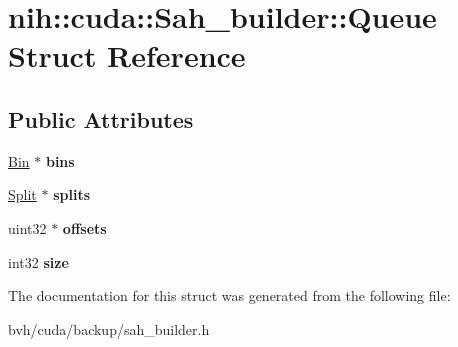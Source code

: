 \hypertarget{structnih_1_1cuda_1_1_sah__builder_1_1_queue}{
\section{nih\-:\-:cuda\-:\-:\-Sah\-\_\-builder\-:\-:\-Queue \-Struct \-Reference}
\label{structnih_1_1cuda_1_1_sah__builder_1_1_queue}
}
\subsection*{\-Public \-Attributes}
\begin{DoxyCompactItemize}
\item 
\hypertarget{structnih_1_1cuda_1_1_sah__builder_1_1_queue_afeb7261cf5ee3d888c67f3a0fdda3cad}{
\hyperlink{structnih_1_1cuda_1_1_sah__builder_1_1_bin}{\-Bin} $\ast$ {\bfseries bins}}
\label{structnih_1_1cuda_1_1_sah__builder_1_1_queue_afeb7261cf5ee3d888c67f3a0fdda3cad}

\item 
\hypertarget{structnih_1_1cuda_1_1_sah__builder_1_1_queue_a55fce2cbbb5389fa0d82b2c4e5d1653a}{
\hyperlink{structnih_1_1cuda_1_1_sah__builder_1_1_split}{\-Split} $\ast$ {\bfseries splits}}
\label{structnih_1_1cuda_1_1_sah__builder_1_1_queue_a55fce2cbbb5389fa0d82b2c4e5d1653a}

\item 
\hypertarget{structnih_1_1cuda_1_1_sah__builder_1_1_queue_a3ddbfa702fc7e03059ce26c59e121011}{
uint32 $\ast$ {\bfseries offsets}}
\label{structnih_1_1cuda_1_1_sah__builder_1_1_queue_a3ddbfa702fc7e03059ce26c59e121011}

\item 
\hypertarget{structnih_1_1cuda_1_1_sah__builder_1_1_queue_a171ed77d5b868345a6f1c6207b662316}{
int32 {\bfseries size}}
\label{structnih_1_1cuda_1_1_sah__builder_1_1_queue_a171ed77d5b868345a6f1c6207b662316}

\end{DoxyCompactItemize}


\-The documentation for this struct was generated from the following file\-:\begin{DoxyCompactItemize}
\item 
bvh/cuda/backup/sah\-\_\-builder.\-h\end{DoxyCompactItemize}
